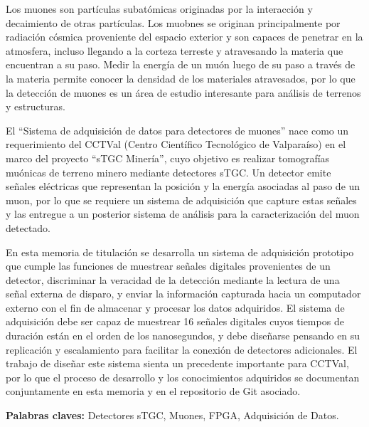 Los muones son partículas subatómicas originadas por la interacción y decaimiento de otras partículas. Los muobnes se originan principalmente por radiación cósmica proveniente del espacio exterior y son capaces de penetrar en la atmosfera, incluso llegando a la corteza terreste y atravesando la materia que encuentran a su paso. Medir la energía de un muón luego de su paso a través de la materia permite conocer la densidad de los materiales atravesados, por lo que la detección de muones es un área de estudio interesante para análisis de terrenos y estructuras.

El ``Sistema de adquisición de datos para detectores de muones'' nace como un requerimiento del CCTVal (Centro Científico Tecnológico de Valparaíso) en  el marco del proyecto ``sTGC Minería'', cuyo objetivo es realizar tomografías muónicas de terreno minero mediante detectores sTGC. Un detector emite señales eléctricas que representan la posición y la energía asociadas al paso de un muon, por lo que se requiere un sistema de adquisición que capture estas señales y las entregue a un posterior sistema de análisis para la caracterización del muon detectado.

En esta memoria de titulación se desarrolla un sistema de adquisición prototipo que cumple las funciones de muestrear señales digitales provenientes de un detector, discriminar la veracidad de la detección mediante la lectura de una señal externa de disparo, y enviar la información capturada hacia un computador externo con el fin de almacenar y procesar los datos adquiridos. El sistema de adquisición debe ser capaz de muestrear 16 señales digitales cuyos tiempos de duración están en el orden de los nanosegundos, y debe diseñarse pensando en su replicación y escalamiento para facilitar la conexión de detectores adicionales. El trabajo de diseñar este sistema sienta un precedente importante para CCTVal, por lo que el proceso de desarrollo y los conocimientos adquiridos se documentan conjuntamente en esta memoria y en el repositorio de Git asociado.

\textbf{Palabras claves:} Detectores sTGC,  Muones, FPGA, Adquisición de Datos.